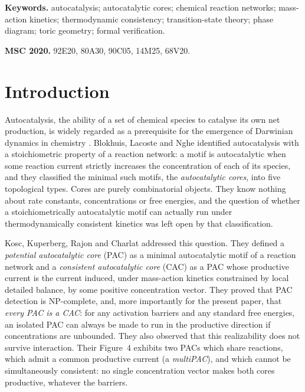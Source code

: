 \documentclass[11pt,a4paper]{article}
\theoremstyle{plain}
\theoremstyle{definition}
\theoremstyle{remark}
\begin{document}
\noindent\textbf{Keywords.} autocatalysis; autocatalytic cores; chemical reaction networks; mass-action kinetics; thermodynamic consistency; transition-state theory; phase diagram; toric geometry; formal verification.

\medskip
\noindent\textbf{MSC 2020.} 92E20, 80A30, 90C05, 14M25, 68V20.

\section{Introduction}\label{sec:intro}

Autocatalysis, the ability of a set of chemical species to catalyse its own net production, is widely regarded as a prerequisite for the emergence of Darwinian dynamics in chemistry \citep{blokhuis2020,hordijk2004,steel2020}. Blokhuis, Lacoste and Nghe \citep{blokhuis2020} identified autocatalysis with a stoichiometric property of a reaction network: a motif is autocatalytic when some reaction current strictly increases the concentration of each of its species, and they classified the minimal such motifs, the \emph{autocatalytic cores}, into five topological types. Cores are purely combinatorial objects. They know nothing about rate constants, concentrations or free energies, and the question of whether a stoichiometrically autocatalytic motif can actually run under thermodynamically consistent kinetics was left open by that classification.

Kosc, Kuperberg, Rajon and Charlat \citep{kosc2025} addressed this question. They defined a \emph{potential autocatalytic core} (PAC) as a minimal autocatalytic motif of a reaction network and a \emph{consistent autocatalytic core} (CAC) as a PAC whose productive current is the current induced, under mass-action kinetics constrained by local detailed balance, by some positive concentration vector. They proved that PAC detection is NP-complete, and, more importantly for the present paper, that \emph{every PAC is a CAC}: for any activation barriers and any standard free energies, an isolated PAC can always be made to run in the productive direction if concentrations are unbounded. They also observed that this realizability does not survive interaction. Their Figure~4 exhibits two PACs which share reactions, which admit a common productive current (a \emph{multiPAC}), and which cannot be simultaneously consistent: no single concentration vector makes both cores productive, whatever the barriers.
\end{document}
